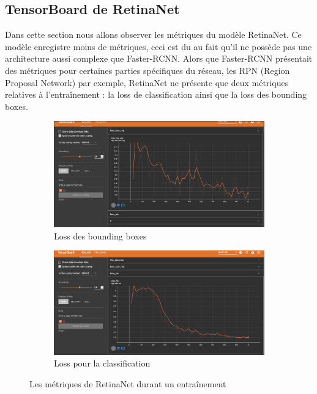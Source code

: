 \subsection {TensorBoard de RetinaNet}\label{anal:train_retina}
Dans cette section nous allons observer les métriques du modèle RetinaNet. Ce modèle enregistre moins de métriques, ceci est du au fait qu'il ne possède pas une architecture aussi complexe que Faster-RCNN. Alors que Faster-RCNN présentait des métriques pour certaines parties spécifiques du réseau, les RPN (Region Proposal Network) par exemple, RetinaNet ne présente que deux métriques relatives à l'entraînement : la loss de classification ainsi que la loss des bounding boxes.
\begin{figure}[h!]
    \begin{subfigure}[h]{0.49\textwidth}
        \centering
        \includegraphics[width=\textwidth]{images/tensorboard_retina_net_loss_box.png}
        \caption{Loss des bounding boxes}
        \label{fig:loss_retinanet_box}
    \end{subfigure}
    \begin{subfigure}[h]{0.49\textwidth}
        \centering
        \includegraphics[width=\textwidth]{images/tensorboard_retina_net_loss_cls.png}
        \caption{Loss pour la classification}
        \label{fig:loss_retinanet_cls}
    \end{subfigure}
    \caption{Les métriques de RetinaNet durant un entraînement}
\end{figure}

